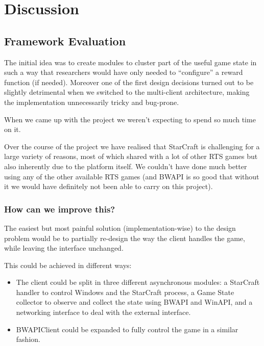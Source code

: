 
\chapter{Discussion}

\section{Framework Evaluation}

The initial idea was to create modules to cluster part of the useful game state
in such a way that researchers would have only needed to ``configure'' a reward
function (if needed). Moreover one of the first design decisions turned out to
be slightly detrimental when we switched to the multi-client architecture,
making the implementation unnecessarily tricky and bug-prone.

When we came up with the project we weren't expecting to spend so much time on
it. 

Over the course of the project we have realised that StarCraft is challenging
for a large variety of reasons, most of which shared with a lot of other RTS
games but also inherently due to the platform itself. We couldn't have done much
better using any of the other available RTS games (and BWAPI is so good that
without it we would have definitely not been able to carry on this project).
 
\subsection{How can we improve this?}

The easiest but most painful solution (implementation-wise) to the design
problem would be to partially re-design the way the client handles the game,
while leaving the interface unchanged.

This could be achieved in different ways:

\begin{itemize}
\item The client could be split in three different asynchronous modules: a
  StarCraft handler to control Windows and the StarCraft process, a Game State
  collector to observe and collect the state using BWAPI and WinAPI, and a
  networking interface to deal with the external interface.
\item BWAPIClient could be expanded to fully control the game in a similar
  fashion.
\end{itemize}

